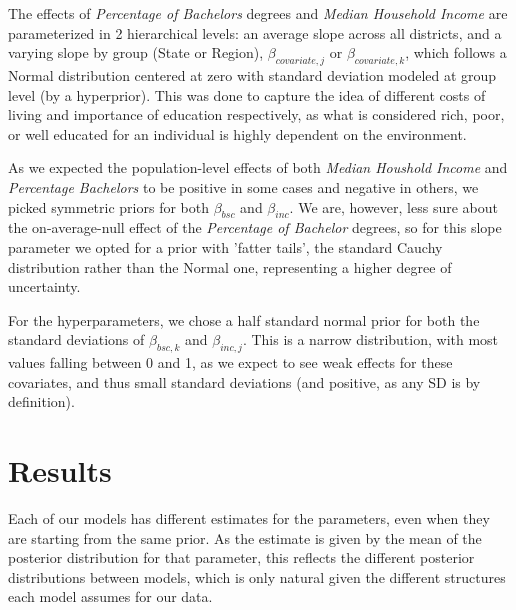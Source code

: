 \documentclass[12pt]{article}
\newcommand{\red}[1]{\textcolor{red}{#1}}
\begin{document}
The effects of \textit{Percentage of Bachelors} degrees and \textit{Median Household Income} are parameterized in 2 hierarchical levels: an average slope across all districts, and a varying slope by group (State or Region), $\beta_{covariate,j}$ or $\beta_{covariate,k}$, which follows a Normal distribution centered at zero with standard deviation modeled at group level (by a hyperprior). This was done to capture the idea of different costs of living and importance of education respectively, as what is considered rich, poor, or well educated for an individual is highly dependent on the environment. 

 

As we expected the population-level effects of both \textit{Median Houshold Income} and \textit{Percentage Bachelors} to be positive in some cases and negative in others, we picked symmetric priors for both $\beta_{bsc}$ and $\beta_{inc}$. We are, however, less sure about the on-average-null effect of the \textit{Percentage of Bachelor} degrees, so for this slope parameter we opted for a prior with 'fatter tails', the standard Cauchy distribution rather than the Normal one, representing a higher degree of uncertainty.


For the hyperparameters, we chose a half standard normal prior for both the standard deviations of $\beta_{bsc,k}$ and $\beta_{inc,j}$. This is a narrow distribution, with most values falling between 0 and 1, as we expect to see weak effects for these covariates, and thus small standard deviations (and positive, as any SD is by definition).











\section{Results}



Each of our models has different estimates for the parameters, even when they are starting from the same prior.
As the estimate is given by the mean of the posterior distribution for that parameter, this reflects the different posterior distributions between models, which is only natural given the different structures each model assumes for our data.
\end{document}
